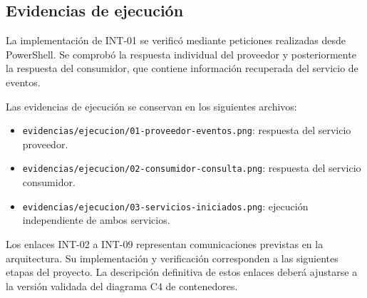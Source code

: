 \subsection{Evidencias de ejecución}

La implementación de INT-01 se verificó mediante peticiones realizadas desde PowerShell. Se comprobó la respuesta individual del proveedor y posteriormente la respuesta del consumidor, que contiene información recuperada del servicio de eventos.

Las evidencias de ejecución se conservan en los siguientes archivos:

\begin{itemize}
    \item \texttt{evidencias/ejecucion/01-proveedor-eventos.png}: respuesta del servicio proveedor.
    \item \texttt{evidencias/ejecucion/02-consumidor-consulta.png}: respuesta del servicio consumidor.
    \item \texttt{evidencias/ejecucion/03-servicios-iniciados.png}: ejecución independiente de ambos servicios.
\end{itemize}

Los enlaces INT-02 a INT-09 representan comunicaciones previstas en la arquitectura. Su implementación y verificación corresponden a las siguientes etapas del proyecto. La descripción definitiva de estos enlaces deberá ajustarse a la versión validada del diagrama C4 de contenedores.
